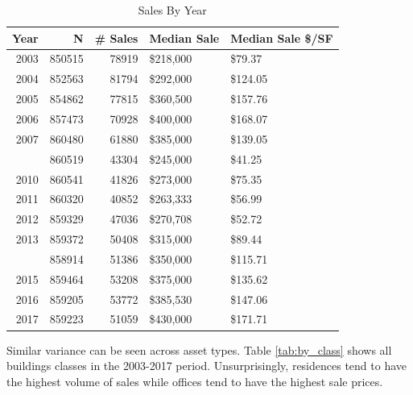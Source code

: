 \documentclass[12pt,]{article}
\begin{document}
\begin{table}

\caption{\label{tab:by_year}\label{tab:by_year} Sales By Year}
\centering
\begin{tabular}[t]{rrrll}
\toprule
Year & N & \# Sales & Median Sale & Median Sale \$/SF\\
\midrule
2003 & 850515 & 78919 & \$218,000 & \$79.37\\
2004 & 852563 & 81794 & \$292,000 & \$124.05\\
2005 & 854862 & 77815 & \$360,500 & \$157.76\\
2006 & 857473 & 70928 & \$400,000 & \$168.07\\
2007 & 860480 & 61880 & \$385,000 & \$139.05\\
\addlinespace
2009 & 860519 & 43304 & \$245,000 & \$41.25\\
2010 & 860541 & 41826 & \$273,000 & \$75.35\\
2011 & 860320 & 40852 & \$263,333 & \$56.99\\
2012 & 859329 & 47036 & \$270,708 & \$52.72\\
2013 & 859372 & 50408 & \$315,000 & \$89.44\\
\addlinespace
2014 & 858914 & 51386 & \$350,000 & \$115.71\\
2015 & 859464 & 53208 & \$375,000 & \$135.62\\
2016 & 859205 & 53772 & \$385,530 & \$147.06\\
2017 & 859223 & 51059 & \$430,000 & \$171.71\\
\bottomrule
\end{tabular}
\end{table}

Similar variance can be seen across asset types. Table
\ref{tab:by_class} shows all buildings classes in the 2003-2017 period.
Unsurprisingly, residences tend to have the highest volume of sales
while offices tend to have the highest sale prices.
\end{document}
